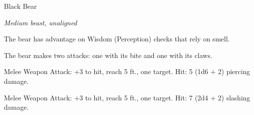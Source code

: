 \begin{monsterbox}{Black Bear}
\begin{hangingpar}
\textit{Medium beast, unaligned}
\end{hangingpar}
\dndline%
\basics[%
armorclass = 11,
hitpoints = 3d8 + 6,
speed = {40 ft., climb 30 ft.}
]
\dndline%
\stats[%
STR = \stat{15},
DEX = \stat{10},
CON = \stat{14},
INT = \stat{2},
WIS = \stat{12},
CHA = \stat{7}
]
\dndline%
\details[%
skills={},
damageimmunities={},
savingthrows={},
conditionimmunities={},
damageresistances={},
damagevulnerabilities={},
senses={passive Perception 13},
challenge=1/2
]
\dndline%
\begin{monsteraction}
The bear has advantage on Wisdom (Perception) checks that rely on smell.
\end{monsteraction}
\begin{monsteraction}[Multiattack]
The bear makes two attacks: one with its bite and one with its claws.
\end{monsteraction}
\begin{monsteraction}[Bite]
Melee Weapon Attack: +3 to hit, reach 5 ft., one target. Hit: 5 (1d6 + 2) piercing damage.
\end{monsteraction}
\begin{monsteraction}[Claws]
Melee Weapon Attack: +3 to hit, reach 5 ft., one target. Hit: 7 (2d4 + 2) slashing damage.
\end{monsteraction}
\end{monsterbox}